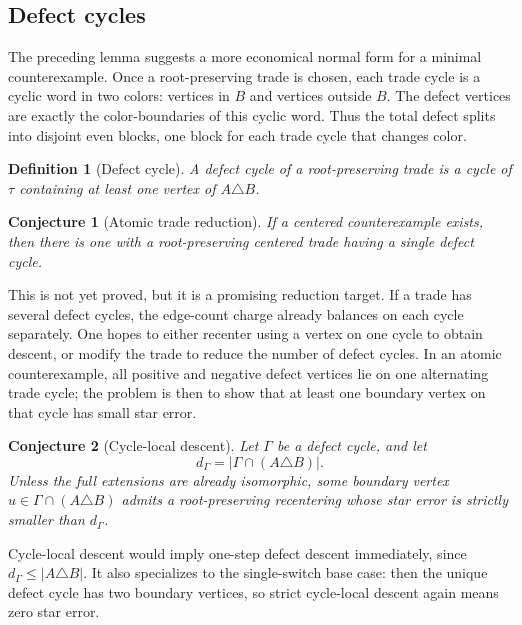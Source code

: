 \documentclass[11pt]{article}
\newtheorem{conjecture}{Conjecture}
\newtheorem{definition}{Definition}
\begin{document}
\subsection{Defect cycles}

The preceding lemma suggests a more economical normal form for a minimal
counterexample.  Once a root-preserving trade is chosen, each trade cycle is a
cyclic word in two colors: vertices in \(B\) and vertices outside \(B\).  The
defect vertices are exactly the color-boundaries of this cyclic word.  Thus
the total defect splits into disjoint even blocks, one block for each trade
cycle that changes color.

\begin{definition}[Defect cycle]
A defect cycle of a root-preserving trade is a cycle of \(\tau\) containing at
least one vertex of \(A\triangle B\).
\end{definition}

\begin{conjecture}[Atomic trade reduction]
If a centered counterexample exists, then there is one with a
root-preserving centered trade having a single defect cycle.
\end{conjecture}

This is not yet proved, but it is a promising reduction target.  If a trade
has several defect cycles, the edge-count charge already balances on each
cycle separately.  One hopes to either recenter using a vertex on one cycle to
obtain descent, or modify the trade to reduce the number of defect cycles.  In
an atomic counterexample, all positive and negative defect vertices lie on one
alternating trade cycle; the problem is then to show that at least one
boundary vertex on that cycle has small star error.

\begin{conjecture}[Cycle-local descent]
Let \(\Gamma\) be a defect cycle, and let
\[
  d_\Gamma=|\Gamma\cap(A\triangle B)|.
\]
Unless the full extensions are already isomorphic, some boundary vertex
\(u\in \Gamma\cap(A\triangle B)\) admits a root-preserving recentering whose
star error is strictly smaller than \(d_\Gamma\).
\end{conjecture}

Cycle-local descent would imply one-step defect descent immediately, since
\(d_\Gamma\leq |A\triangle B|\).  It also specializes to the single-switch
base case: then the unique defect cycle has two boundary vertices, so strict
cycle-local descent again means zero star error.
\end{document}
